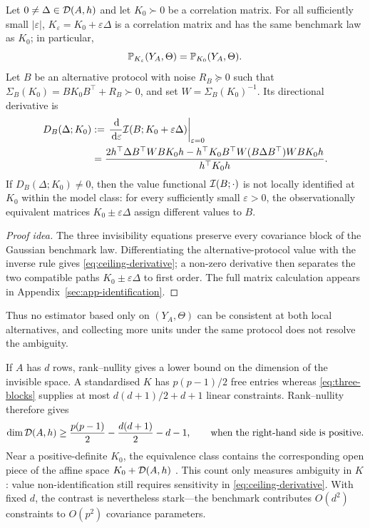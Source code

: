 \begin{theorem}
\label{thm:impossibility}
Let $0\neq\Delta\in\mathcal{D}(A,h)$ and let $K_0\succ0$ be a correlation matrix. For
all sufficiently small $|\varepsilon|$, $K_\varepsilon=K_0+\varepsilon\Delta$
is a correlation matrix and has the same benchmark law as $K_0$; in
particular,
\begin{equation}
\mathbb{P}_{K_\varepsilon}(Y_A,\Theta)=\mathbb{P}_{K_0}(Y_A,\Theta).
\label{eq:obs-equivalent}
\end{equation}
Let $B$ be an alternative protocol with noise $R_B\succeq0$ such that
$\Sigma_B(K_0)=BK_0B^\top+R_B\succ0$, and set
$W=\Sigma_B(K_0)^{-1}$. Its directional derivative is
\begin{equation}
\begin{aligned}
D_B(\Delta;K_0)
&:=\left.\frac{\,\mathrm{d}}{\,\mathrm{d}\varepsilon}
\mathcal{I}(B;K_0+\varepsilon\Delta)\right|_{\varepsilon=0}\\
&=\frac{2h^\top\Delta B^\top WBK_0h
-h^\top K_0B^\top W(B\Delta B^\top)WBK_0h}{h^\top K_0h}.
\end{aligned}
\label{eq:ceiling-derivative}
\end{equation}
If $D_B(\Delta;K_0)\neq0$, then the value functional $\mathcal{I}(B;\cdot)$ is not
locally identified at $K_0$ within the model class: for every sufficiently
small $\varepsilon>0$, the observationally equivalent matrices
$K_0\pm\varepsilon\Delta$ assign different values to $B$.
\end{theorem}

\begin{proof}[Proof idea]
The three invisibility equations preserve every covariance block of the
Gaussian benchmark law. Differentiating the alternative-protocol value with
the inverse rule gives \eqref{eq:ceiling-derivative}; a non-zero derivative
then separates the two compatible paths $K_0\pm\varepsilon\Delta$ to first
order. The full matrix calculation appears in
Appendix~\ref{sec:app-identification}.
\end{proof}

Thus no estimator based only on $(Y_A,\Theta)$ can be consistent at both local
alternatives, and collecting more units under the same protocol does not
resolve the ambiguity.

If $A$ has $d$ rows, rank--nullity gives a lower bound on the dimension of the
invisible space. A standardised $K$ has $p(p-1)/2$ free entries whereas
\eqref{eq:three-blocks} supplies at most $d(d+1)/2+d+1$ linear constraints.
Rank--nullity therefore gives
\begin{equation}
\dim\mathcal{D}(A,h)\ge
\frac{p(p-1)}2-\frac{d(d+1)}2-d-1,
\qquad
\text{when the right-hand side is positive.}
\label{eq:counting}
\end{equation}
Near a positive-definite $K_0$, the equivalence class contains the corresponding
open piece of the affine space $K_0+\mathcal{D}(A,h)$
\citep{rothenberg1971identification}. This count only measures ambiguity in
$K$: value non-identification still requires sensitivity in
\eqref{eq:ceiling-derivative}. With fixed $d$, the contrast is nevertheless
stark---the benchmark contributes $O(d^2)$ constraints to $O(p^2)$ covariance
parameters.

